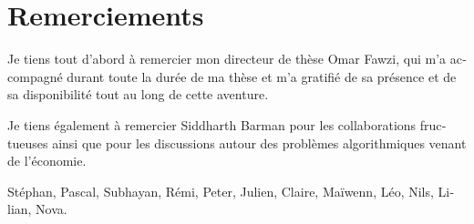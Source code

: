 \thispagestyle{empty}
\chapter*{Remerciements}

\begin{otherlanguage}{french}
  Je tiens tout d'abord à remercier mon directeur de thèse Omar Fawzi, qui m'a accompagné durant toute la durée de ma thèse et m'a gratifié de sa présence et de sa disponibilité tout au long de cette aventure.
  
  Je tiens également à remercier Siddharth Barman pour les collaborations fructueuses ainsi que pour les discussions autour des problèmes algorithmiques venant de l'économie.

  Stéphan, Pascal, Subhayan, Rémi, Peter, Julien, Claire, Maïwenn, Léo, Nils, Lilian, Nova.
\end{otherlanguage}
 
